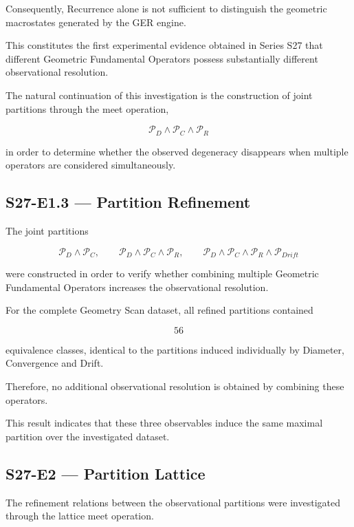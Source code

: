 Consequently, Recurrence alone is not sufficient to distinguish the geometric macrostates generated by the GER engine.

This constitutes the first experimental evidence obtained in Series S27 that different Geometric Fundamental Operators possess substantially different observational resolution.

The natural continuation of this investigation is the construction of joint partitions through the meet operation,

\[
\mathcal P_D
\wedge
\mathcal P_C
\wedge
\mathcal P_R
\]

in order to determine whether the observed degeneracy disappears when multiple operators are considered simultaneously.

\subsection{S27-E1.3 --- Partition Refinement}

The joint partitions

\[
\mathcal P_D
\wedge
\mathcal P_C,
\qquad
\mathcal P_D
\wedge
\mathcal P_C
\wedge
\mathcal P_R,
\qquad
\mathcal P_D
\wedge
\mathcal P_C
\wedge
\mathcal P_R
\wedge
\mathcal P_{Drift}
\]

were constructed in order to verify whether combining multiple Geometric Fundamental Operators increases the observational resolution.

For the complete Geometry Scan dataset, all refined partitions contained

\[
56
\]

equivalence classes, identical to the partitions induced individually by Diameter, Convergence and Drift.

Therefore, no additional observational resolution is obtained by combining these operators.

This result indicates that these three observables induce the same maximal partition over the investigated dataset.


\subsection{S27-E2 --- Partition Lattice}

The refinement relations between the observational partitions were investigated through the lattice meet operation.

